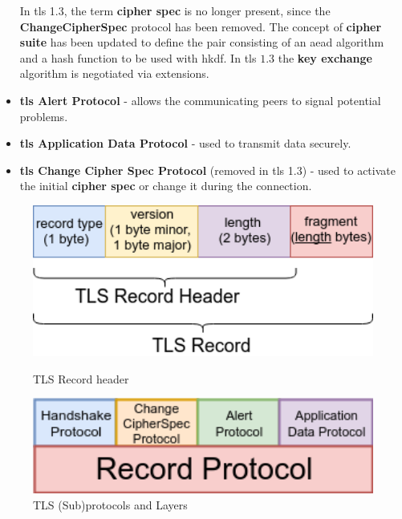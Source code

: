 \documentclass{llncs}
\begin{document}
\begin{itemize}
  In \gls{tls} 1.3, the term
   \textbf{cipher spec} is no longer present, since the \textbf{ChangeCipherSpec}
   protocol has been removed. The concept of \textbf{cipher suite} has been updated
   to define the pair consisting of an \gls{aead} algorithm and a hash function to be used with
   \gls{hkdf}. In \gls{tls} $1.3$ the \textbf{key exchange} algorithm is negotiated via
   extensions.
  \item \textbf{\gls{tls} Alert Protocol} - allows the communicating peers to
  signal potential problems.
  \item \textbf{\gls{tls} Application Data Protocol} - used to transmit data securely.
  \item \textbf{\gls{tls} Change Cipher Spec Protocol} (removed in \gls{tls} 1.3) -
  used to activate the initial \textbf{cipher spec} or change it during the connection.
\end{itemize}

\begin{figure}
    \centering
    \begin{minipage}{0.5\textwidth}
        \centering
        \includegraphics[width=1.0\textwidth]{img/record-header-3.png} %
        \caption{\label{fig:tls-record-header} TLS Record header}
    \end{minipage}\hfill
    \begin{minipage}{0.47\textwidth}
        \centering
        \includegraphics[width=1.0\textwidth]{img/tls-sub-protocols-3.png} %
        \caption{\label{fig:tls-subprotocols} TLS (Sub)protocols and Layers}
    \end{minipage}
\end{figure}
\end{document}

